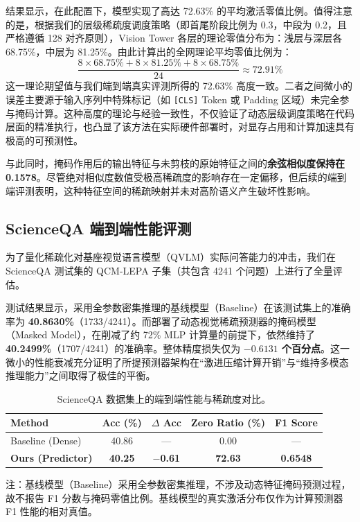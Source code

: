 \documentclass[sigconf]{acmart}
\begin{document}
结果显示，在此配置下，模型实现了高达 72.63\% 的平均激活零值比例。值得注意的是，根据我们的层级稀疏度调度策略（即首尾阶段比例为 0.3，中段为 0.2，且严格遵循 128 对齐原则），Vision Tower 各层的理论零值分布为：浅层与深层各 68.75\%，中层为 81.25\%。由此计算出的全网理论平均零值比例为：
\begin{equation}
    \frac{8 \times 68.75\% + 8 \times 81.25\% + 8 \times 68.75\%}{24} \approx 72.91\%
\end{equation}
这一理论期望值与我们端到端真实评测所得的 72.63\% 高度一致。二者之间微小的误差主要源于输入序列中特殊标记（如 \texttt{[CLS]} Token 或 Padding 区域）未完全参与掩码计算。这种高度的理论与经验一致性，不仅验证了动态层级调度策略在代码层面的精准执行，也凸显了该方法在实际硬件部署时，对显存占用和计算加速具有极高的可预测性。

与此同时，掩码作用后的输出特征与未剪枝的原始特征之间的\textbf{余弦相似度保持在 0.1578}。尽管绝对相似度数值受极高稀疏度的影响存在一定偏移，但后续的端到端评测表明，这种特征空间的稀疏映射并未对高阶语义产生破坏性影响。

\subsection{ScienceQA 端到端性能评测 }
为了量化稀疏化对基座视觉语言模型（QVLM）实际问答能力的冲击，我们在 ScienceQA 测试集的 QCM-LEPA 子集（共包含 4241 个问题）上进行了全量评估。

测试结果显示，采用全参数密集推理的基线模型（Baseline）在该测试集上的准确率为 \textbf{40.8630\%}（1733/4241）。而部署了动态视觉稀疏预测器的掩码模型（Masked Model），在削减了约 72\% MLP 计算量的前提下，依然维持了 \textbf{40.2499\%}（1707/4241）的准确率。整体精度损失仅为 \textbf{$-0.6131$ 个百分点}。这一微小的性能衰减充分证明了所提预测器架构在“激进压缩计算开销”与“维持多模态推理能力”之间取得了极佳的平衡。

\begin{table}[htbp]
    \centering
    \begin{threeparttable}
        \caption{ScienceQA 数据集上的端到端性能与稀疏度对比。}
        \label{tab:main_results}
        \begin{tabular}{lcccc}
            \toprule
            \textbf{Method} & \textbf{Acc (\%)} & \textbf{$\Delta$ Acc} & \textbf{Zero Ratio (\%)} & \textbf{F1 Score} \\
            \midrule
            Baseline (Dense)\tnote{*} & 40.86 & --- & 0.00 & --- \\
            \textbf{Ours (Predictor)} & \textbf{40.25} & \textbf{$-$0.61} & \textbf{72.63} & \textbf{0.6548} \\
            \bottomrule
        \end{tabular}
        \begin{tablenotes}
            \small
            \item[*] 注：基线模型（Baseline）采用全参数密集推理，不涉及动态特征掩码预测过程，故不报告 F1 分数与掩码零值比例。基线模型的真实激活分布仅作为计算预测器 F1 性能的相对真值。
        \end{tablenotes}
    \end{threeparttable}
\end{table}
	
\end{document}
